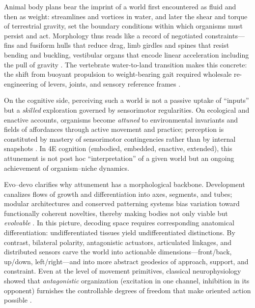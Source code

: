 Animal body plans bear the imprint of a world first encountered as fluid and then as weight: streamlines and vortices in water, and later the shear and torque of terrestrial gravity, set the boundary conditions within which organisms must persist and act. Morphology thus reads like a record of negotiated constraints---fins and fusiform hulls that reduce drag, limb girdles and spines that resist bending and buckling, vestibular organs that encode linear acceleration including the pull of gravity \citep{lighthill1975mathematical,vogel1996life,angelaki2008vestibular}. The vertebrate water-to-land transition makes this concrete: the shift from buoyant propulsion to weight-bearing gait required wholesale re-engineering of levers, joints, and sensory reference frames \citep{clack2012gaining}.

On the cognitive side, perceiving such a world is not a passive uptake of “inputs” but a \emph{skilled} exploration governed by sensorimotor regularities. On ecological and enactive accounts, organisms become \emph{attuned} to environmental invariants and fields of affordances through active movement and practice; perception is constituted by mastery of sensorimotor contingencies rather than by internal snapshots \citep{gibson1979ecological,oregan2001sensorimotor,noe2004action,chemero2009radical,rietveld2014rich}. In 4E cognition (embodied, embedded, enactive, extended), this attunement is not post hoc “interpretation” of a given world but an ongoing achievement of organism–niche dynamics.

Evo–devo clarifies why attunement has a morphological backbone. Development canalizes flows of growth and differentiation into axes, segments, and tubes; modular architectures and conserved patterning systems bias variation toward functionally coherent novelties, thereby making bodies not only viable but \emph{evolvable} \citep{maynardsmith1985developmental,west-eberhard2003developmental,wagner1996evolvability,carroll2008evodevo}. In this picture, decoding space requires corresponding anatomical differentiation: undifferentiated tissues yield undifferentiated distinctions. By contrast, bilateral polarity, antagonistic actuators, articulated linkages, and distributed sensors carve the world into actionable dimensions—front/back, up/down, left/right—and into more abstract geodesics of approach, support, and constraint. Even at the level of movement primitives, classical neurophysiology showed that \emph{antagonistic} organization (excitation in one channel, inhibition in its opponent) furnishes the controllable degrees of freedom that make oriented action possible \citep{sherrington1906integrative,sherrington1905reciprocal}.

